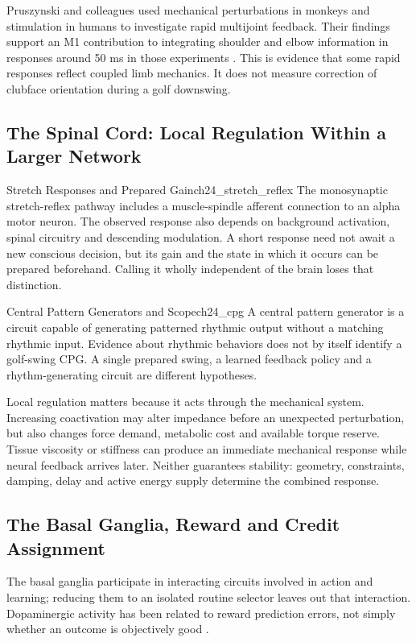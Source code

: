 Pruszynski and colleagues used mechanical perturbations in monkeys and stimulation in humans to investigate rapid multijoint feedback. Their findings support an M1 contribution to integrating shoulder and elbow information in responses around 50 ms in those experiments \citep{Pruszynski2011Feedback}. This is evidence that some rapid responses reflect coupled limb mechanics. It does not measure correction of clubface orientation during a golf downswing.

\subsection{The Spinal Cord: Local Regulation Within a Larger Network}
\label{subsec:ch24_spinal_cord}
\begin{definition}{Stretch Responses and Prepared Gain}{ch24_stretch_reflex}
The monosynaptic stretch-reflex pathway includes a muscle-spindle afferent connection to an alpha motor neuron. The observed response also depends on background activation, spinal circuitry and descending modulation. A short response need not await a new conscious decision, but its gain and the state in which it occurs can be prepared beforehand. Calling it wholly independent of the brain loses that distinction.
\end{definition}

\begin{definition}{Central Pattern Generators and Scope}{ch24_cpg}
A central pattern generator is a circuit capable of generating patterned rhythmic output without a matching rhythmic input. Evidence about rhythmic behaviors does not by itself identify a golf-swing CPG. A single prepared swing, a learned feedback policy and a rhythm-generating circuit are different hypotheses.
\end{definition}

Local regulation matters because it acts through the mechanical system. Increasing coactivation may alter impedance before an unexpected perturbation, but also changes force demand, metabolic cost and available torque reserve. Tissue viscosity or stiffness can produce an immediate mechanical response while neural feedback arrives later. Neither guarantees stability: geometry, constraints, damping, delay and active energy supply determine the combined response.

\subsection{The Basal Ganglia, Reward and Credit Assignment}
\label{subsec:ch24_basal_ganglia}
The basal ganglia participate in interacting circuits involved in action and learning; reducing them to an isolated routine selector leaves out that interaction. Dopaminergic activity has been related to reward prediction errors, not simply whether an outcome is objectively good \citep{schultz1997dopamine}.

